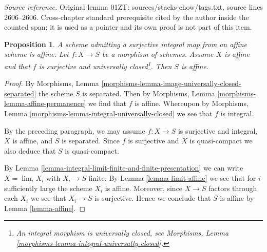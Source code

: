 \documentclass[10pt,a4paper]{amsart}
\newenvironment{slogan}{\comment}{\endcomment}
\theoremstyle{plain}
\newtheorem{proposition}[subsection]{Proposition}
\theoremstyle{definition}
\theoremstyle{remark}
\numberwithin{equation}{subsection}
\def\lim{\mathop{\mathrm{lim}}\nolimits}
\newenvironment{slogan}{\setbox\limrefbox=\vbox\bgroup}{\egroup\ignorespaces}
\begin{document}
\noindent\textit{Source reference.} Original lemma 01ZT: sources/stacks-chow/tags.txt, source lines 2606--2606. Cross-chapter standard prerequisite cited by the author inside the counted span; it is used as a pointer and its own proof is not part of this item.\par\medskip
\begin{proposition}
\label{proposition-affine}
\begin{slogan}
A scheme admitting a surjective integral map from an affine scheme is affine.
\end{slogan}
Let $f : X \to S$ be a morphism of schemes. Assume $X$ is affine
and that $f$ is surjective and universally closed\footnote{An integral
morphism is universally closed, see
Morphisms, Lemma \ref{morphisms-lemma-integral-universally-closed}.}.
Then $S$ is affine.
\end{proposition}

\begin{proof}
By Morphisms, Lemma \ref{morphisms-lemma-image-universally-closed-separated}
the scheme $S$ is separated. Then by
Morphisms, Lemma \ref{morphisms-lemma-affine-permanence}
we find that $f$ is affine. Whereupon by
Morphisms, Lemma \ref{morphisms-lemma-integral-universally-closed}
we see that $f$ is integral.

\medskip\noindent
By the preceding paragraph, we may assume $f : X \to S$
is surjective and integral, $X$ is affine, and $S$ is separated.
Since $f$ is surjective and $X$ is quasi-compact we also deduce that $S$ is
quasi-compact.

\medskip\noindent
By Lemma \ref{lemma-integral-limit-finite-and-finite-presentation}
we can write $X = \lim_i X_i$ with $X_i \to S$ finite. By
Lemma \ref{lemma-limit-affine}
we see that for $i$ sufficiently large the scheme $X_i$ is affine.
Moreover, since $X \to S$ factors through each $X_i$ we see that
$X_i \to S$ is surjective. Hence we conclude that $S$ is affine by
Lemma \ref{lemma-affine}.
\end{proof}
\end{document}
